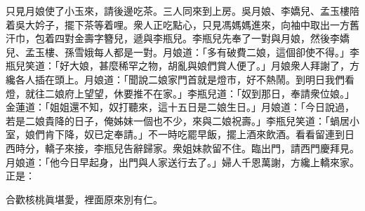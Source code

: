 只見月娘使了小玉來，請後邊吃茶。三人同來到上房。吳月娘、李嬌兒、孟玉樓陪着吳大妗子，擺下茶等着哩。衆人正吃點心，只見馮媽媽進來，向袖中取出一方舊汗巾，包着四對金壽字簪兒，遞與李瓶兒。李瓶兒先奉了一對與月娘，然後李嬌兒、孟玉樓、孫雪娥每人都是一對。月娘道：「多有破費二娘，這個卻使不得。」李瓶兒笑道：「好大娘，甚麼稀罕之物，胡亂與娘們賞人便了。」月娘衆人拜謝了，方纔各人插在頭上。月娘道：「聞說二娘家門首就是燈市，好不熱鬧。到明日我們看燈，就往二娘府上望望，休要推不在家。」李瓶兒道：「奴到那日，奉請衆位娘。」金蓮道：「姐姐還不知，奴打聽來，這十五日是二娘生日。」月娘道：「今日說過，若是二娘貴降的日子，俺姊妹一個也不少，來與二娘祝壽。」李瓶兒笑道：「蝸居小室，娘們肯下降，奴已定奉請。」不一時吃罷早飯，擺上酒來飲酒。看看留連到日西時分，轎子來接，李瓶兒告辭歸家。衆姐妹款留不住。臨出門，請西門慶拜見。月娘道：「他今日早起身，出門與人家送行去了。」婦人千恩萬謝，方纔上轎來家。正是：

\begin{myquote}
合歡核桃眞堪愛，裡面原來別有仁。
\end{myquote}

